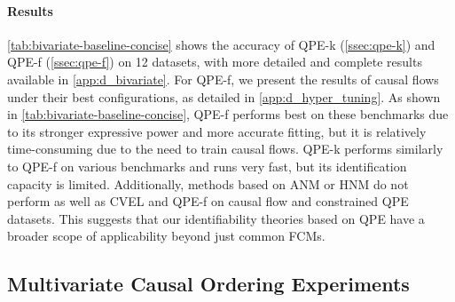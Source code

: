 \documentclass{article}
\theoremstyle{plain}
\theoremstyle{definition}
\theoremstyle{remark}
\begin{document}
\paragraph{Results} \cref{tab:bivariate-baseline-concise} shows the accuracy of QPE-k (\cref{ssec:qpe-k}) and QPE-f (\cref{ssec:qpe-f}) on 12 datasets, with more detailed and complete results available in \cref{app:d_bivariate}. For QPE-f, we present the results of causal flows under their best configurations, as detailed in \cref{app:d_hyper_tuning}. As shown in \cref{tab:bivariate-baseline-concise}, QPE-f performs best on these benchmarks due to its stronger expressive power and more accurate fitting, but it is relatively time-consuming due to the need to train causal flows. QPE-k performs similarly to QPE-f on various benchmarks and runs very fast, but its identification capacity is limited. Additionally, methods based on ANM or HNM do not perform as well as CVEL and QPE-f on causal flow and constrained QPE datasets. This suggests that our identifiability theories based on QPE have a broader scope of applicability beyond just common FCMs.%
\subsection{Multivariate Causal Ordering Experiments}
\label{ssec:expr_multivariate}

\end{document}
